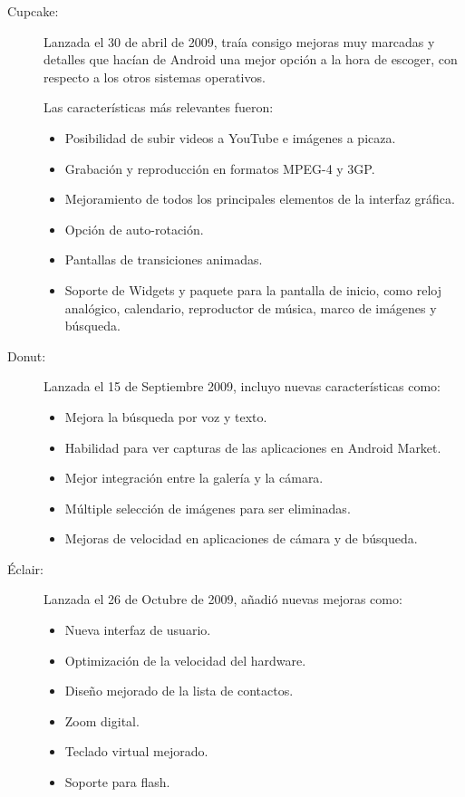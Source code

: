 \begin{description}
	\item[Cupcake:]
		Lanzada el 30 de abril de 2009, traía consigo mejoras muy marcadas y detalles que hacían de Android una mejor opción a la hora de escoger, con respecto a los otros sistemas 
		operativos.
		
		Las características más relevantes fueron:
		\begin{itemize}
			\item Posibilidad de subir videos a YouTube e imágenes a picaza.
			\item Grabación y reproducción en formatos MPEG-4 y 3GP.
			\item Mejoramiento de todos los principales elementos de la interfaz gráfica.
			\item Opción de auto-rotación.
			\item Pantallas de transiciones animadas.
			\item Soporte de Widgets y paquete para la pantalla de inicio, como reloj analógico, calendario, reproductor de música, marco de imágenes y búsqueda.
		\end{itemize}
	
	\item[Donut:]
		Lanzada el 15 de Septiembre 2009, incluyo nuevas características como:
		\begin{itemize}
			\item Mejora la búsqueda por voz y texto.
			\item Habilidad para ver capturas de las aplicaciones en Android Market.
			\item Mejor integración entre la galería y la cámara.
			\item Múltiple selección de imágenes para ser eliminadas.
			\item Mejoras de velocidad en aplicaciones de cámara y de búsqueda.
		\end{itemize}
		
	\item[Éclair:]
		Lanzada el 26 de Octubre de 2009, añadió nuevas mejoras como:
		\begin{itemize}
			\item Nueva interfaz de usuario.
			\item Optimización de la velocidad del hardware.
			\item Diseño mejorado de la lista de contactos.
			\item Zoom digital.
			\item Teclado virtual mejorado.
			\item Soporte para flash.
		\end{itemize}
	

\end{description}
